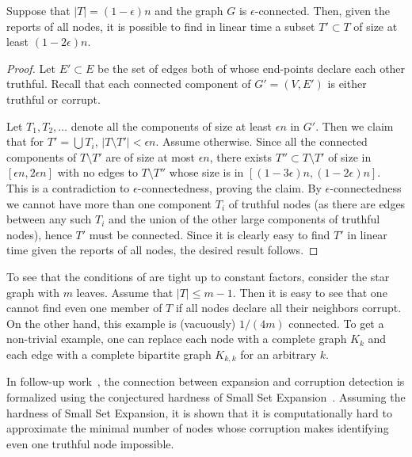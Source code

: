 \documentclass{toc}
\begin{document}
\begin{proposition} \label{c:41} 
%
Suppose that $|T| = (1-\epsilon)n$ and the 
graph $G$ is $\epsilon$-connected.
Then, given the reports of all nodes, 
it is possible to find  in linear time a subset
%
%
$T' \subset T$ of size at least $(1-2\epsilon) n$. 
\end{proposition}

\begin{proof}
Let $E' \subset E$ be the set of edges both of 
whose end-points declare each other truthful. 
Recall that each connected component of $G'=(V,E')$ is either truthful or corrupt. 
%
%
%
%

Let $T_1, T_2,\ldots$ denote all the components of size at least $\epsilon
n$ in $G'$. Then we claim that for $T' = \bigcup T_i$, $|T \setminus T'|
< \epsilon n$. Assume otherwise. Since all the connected components of
$T \setminus T'$ are of size at most $\epsilon n$, there exists $T''
\subset T \setminus T'$ of size in $[\epsilon n, 2 \epsilon n]$ with no
edges to 
%
$T \setminus T''$ whose size is in $[(1-3\epsilon)n ,(1-2\epsilon)
n]$. This is a contradiction to $\epsilon$-connectedness,
%
proving the claim. By $\epsilon$-connectedness we cannot have more
than one component $T_i$ of truthful nodes (as there are
edges between any such $T_i$ and the union of the other large
components of truthful nodes), hence $T'$ must be connected. Since it
is clearly easy to find $T'$ 
%
in linear time  given the reports of all nodes,
the desired result follows.
\end{proof}

To see that the conditions of  are tight up to constant
factors, consider the star graph with $m$ leaves.  Assume that 
%
$|T| \leq m-1$. 
Then it is easy to see that one cannot find even one member of $T$
if all nodes declare all their neighbors corrupt. On the other hand,
this example is (vacuously) $1/(4m)$ connected.  To get a non-trivial
example, one can replace each node with a complete graph $K_k$ and each
edge with a complete bipartite graph $K_{k,k}$ for an arbitrary $k$.

In 
%
follow-up    %
work~\cite{JiMoRa:18}, the connection between expansion and corruption detection is formalized using the conjectured hardness of Small Set Expansion~\cite{RS}. Assuming the hardness of Small Set Expansion, 
it is shown that it is computationally hard to approximate the minimal number of nodes whose corruption makes identifying even one truthful node impossible. 
\end{document}
